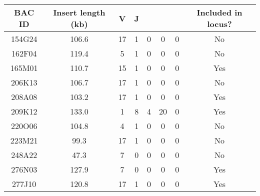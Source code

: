 \begin{tabular}{cccccccc}\toprule
\textbf{BAC ID} & \textbf{Insert length (kb)} & \textbf{V} & \textbf{J} & \textbf{\cm{}} & \textbf{\cd{}} & \textbf{\cz{}} & \textbf{Included in locus?}\\\midrule
154G24 & 106.6 & 17 & 1 & 0 & 0  & 0 & No\\
162F04 & 119.4 & 5  & 1 & 0 & 0  & 0 & No\\
165M01 & 110.7 & 15 & 1 & 0 & 0  & 0 & Yes\\
206K13 & 106.7 & 17 & 1 & 0 & 0  & 0 & No\\
208A08 & 103.2 & 17 & 1 & 0 & 0  & 0 & Yes\\
209K12 & 133.0 & 1  & 8 & 4 & 20 & 0 & Yes\\
220O06 & 104.8 & 4  & 1 & 0 & 0  & 0 & No\\
223M21 & 99.3  & 17 & 1 & 0 & 0  & 0 & No\\
248A22 & 47.3  & 7  & 0 & 0 & 0  & 0 & No\\
276N03 & 127.9 & 7  & 0 & 0 & 0  & 0 & Yes\\
277J10 & 120.8 & 17 & 1 & 0 & 0  & 0 & Yes\\
\bottomrule\end{tabular}
